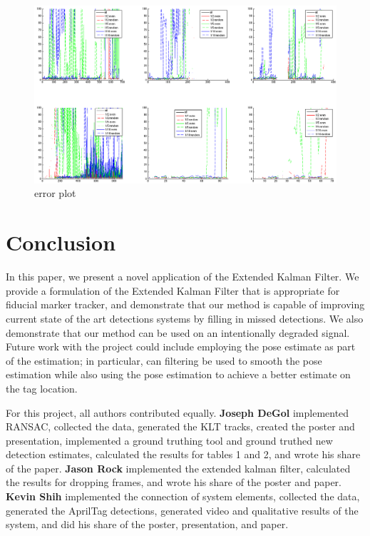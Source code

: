\documentclass[letterpaper,10pt,conference]{IEEEtran}
\begin{document}
\begin{figure}
\includegraphics[scale=.3]{Corner_error}
\caption{error plot}
\label{fig:error_plot}
\end{figure}



\section{Conclusion}
\label{sec:conclusion}
In this paper, we present a novel application of the Extended Kalman Filter. We provide a formulation of the Extended Kalman Filter that is appropriate for fiducial marker tracker, and demonstrate that our method is capable of improving current state of the art detections systems by filling in missed detections. We also demonstrate that our method can be used on an intentionally degraded signal. Future work with the project could include employing the pose estimate as part of the estimation; in particular, can filtering be used to smooth the pose estimation while also using the pose estimation to achieve a better estimate on the tag location.

For this project, all authors contributed equally.
\textbf{Joseph DeGol} implemented RANSAC, collected the data, generated the KLT tracks, created the poster and presentation, implemented a ground truthing tool and ground truthed new detection estimates, calculated the results for tables 1 and 2, and wrote his share of the paper. \textbf{Jason Rock} implemented the extended kalman filter, calculated the results for dropping frames, and wrote his share of the poster and paper. \textbf{Kevin Shih} implemented the connection of system elements, collected the data, generated the AprilTag detections, generated video and qualitative results of the system, and did his share of the poster, presentation, and paper.





\end{document}
